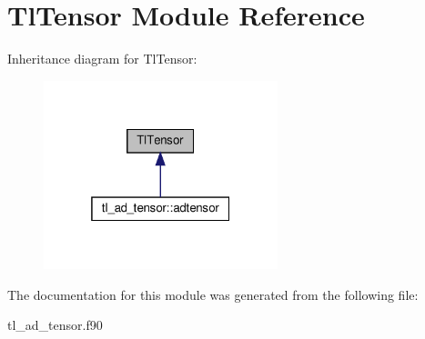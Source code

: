 \hypertarget{classTlTensor}{}\section{Tl\+Tensor Module Reference}
\label{classTlTensor}


Inheritance diagram for Tl\+Tensor\+:\nopagebreak
\begin{figure}[H]
\begin{center}
\leavevmode
\includegraphics[width=193pt]{classTlTensor__inherit__graph}
\end{center}
\end{figure}


The documentation for this module was generated from the following file\+:\begin{DoxyCompactItemize}
\item 
tl\+\_\+ad\+\_\+tensor.\+f90\end{DoxyCompactItemize}
